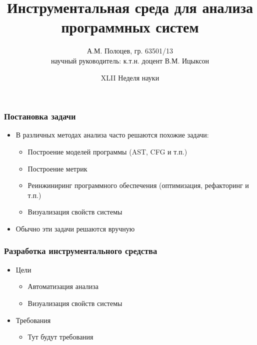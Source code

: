 \documentclass{beamer}
\title[]{Инструментальная среда для анализа программных систем}
\author[А.М. Полоцев]{
    А.М. Полоцев, гр. 63501/13\\
    научный руководитель: к.т.н. доцент В.М. Ицыксон
}
\date[XLII Неделя науки]{XLII Неделя науки}
\begin{document}
\frame{\titlepage}
\begin{frame}
\frametitle{Постановка задачи}

\begin{itemize}
    \item В различных методах анализа часто решаются похожие задачи:
    \begin{itemize}
        \item Построение моделей программы (AST, CFG и т.п.)
        \item Построение метрик
        \item Реинжиниринг программного обеспечения (оптимизация, рефакторинг и т.п.)
        \item Визуализация свойств системы
    \end{itemize}
    \item Обычно эти задачи решаются вручную
\end{itemize}
\end{frame}
\begin{frame}
\frametitle{Разработка инструментального средства}

\begin{itemize}
    \item Цели
        \begin{itemize}
            \item Автоматизация анализа
            \item Визуализация свойств системы
        \end{itemize}
    \item Требования
        \begin{itemize}
            \item Тут будут требования
        \end{itemize}
\end{itemize}
\end{frame}
\end{document}
